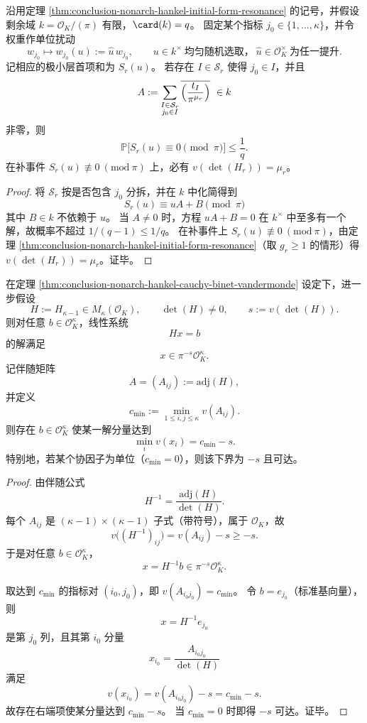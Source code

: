\begin{proposition}[有限剩余域上的随机单位扰动与首项去消去]\label{prop:conclusion-nonarch-hankel-random-unit-perturbation}
沿用定理 \ref{thm:conclusion-nonarch-hankel-initial-form-resonance} 的记号，并假设剩余域 \(k=\mathcal O_K/(\pi)\) 有限，\(\card(k)=q\)。
固定某个指标 \(j_0\in\{1,\dots,\kappa\}\)，并令权重作单位扰动
\[
w_{j_0}\longmapsto w_{j_0}(u):=\widehat u\,w_{j_0},
\qquad
u\in k^\times\ \text{均匀随机选取，}\ \widehat u\in\mathcal O_K^\times\ \text{为任一提升}.
\]
记相应的极小层首项和为 \(S_r(u)\)。
若存在 \(I\in\mathcal S_r\) 使得 \(j_0\in I\)，并且
\[
A:=\sum_{\substack{I\in\mathcal S_r\\ j_0\in I}}
\overline{\Bigl(\frac{t_I}{\pi^{\mu_r}}\Bigr)}\ \in k
\]
非零，则
\[
\mathbb P\bigl[S_r(u)\equiv 0\pmod{\pi}\bigr]\le \frac{1}{q}.
\]
在补事件 \(S_r(u)\not\equiv 0\ (\mathrm{mod}\ \pi)\) 上，必有 \(v(\det(H_r))=\mu_r\)。
\end{proposition}
\begin{proof}
将 \(\mathcal S_r\) 按是否包含 \(j_0\) 分拆，并在 \(k\) 中化简得到
\[
S_r(u)\equiv uA+B\pmod{\pi}
\]
其中 \(B\in k\) 不依赖于 \(u\)。
当 \(A\neq 0\) 时，方程 \(uA+B=0\) 在 \(k^\times\) 中至多有一个解，故概率不超过 \(1/(q-1)\le 1/q\)。
在补事件上 \(S_r(u)\not\equiv 0\ (\mathrm{mod}\ \pi)\)，由定理 \ref{thm:conclusion-nonarch-hankel-initial-form-resonance}（取 \(g_r\ge 1\) 的情形）得 \(v(\det(H_r))=\mu_r\)。证毕。
\end{proof}

\begin{corollary}\label{cor:conclusion-nonarch-prony-precision-loss}
在定理 \ref{thm:conclusion-nonarch-hankel-cauchy-binet-vandermonde} 设定下，进一步假设
\[
H:=H_{\kappa-1}\in M_\kappa(\mathcal O_K),\qquad
\det(H)\neq 0,\qquad
s:=v(\det(H)).
\]
则对任意 \(b\in\mathcal O_K^\kappa\)，线性系统
\[
Hx=b
\]
的解满足
\[
x\in \pi^{-s}\mathcal O_K^\kappa.
\]
记伴随矩阵
\[
A=(A_{ij}):=\mathrm{adj}(H),
\]
并定义
\[
c_{\min}:=\min_{1\le i,j\le \kappa}v(A_{ij}).
\]
则存在 \(b\in\mathcal O_K^\kappa\) 使某一解分量达到
\[
\min_i v(x_i)=c_{\min}-s.
\]
特别地，若某个协因子为单位（\(c_{\min}=0\)），则该下界为 \(-s\) 且可达。
\end{corollary}
\begin{proof}
由伴随公式
\[
H^{-1}=\frac{\mathrm{adj}(H)}{\det(H)}.
\]
每个 \(A_{ij}\) 是 \((\kappa-1)\times(\kappa-1)\) 子式（带符号），属于 \(\mathcal O_K\)，故
\[
v\!\bigl((H^{-1})_{ij}\bigr)=v(A_{ij})-s\ge -s.
\]
于是对任意 \(b\in\mathcal O_K^\kappa\)，
\[
x=H^{-1}b\in \pi^{-s}\mathcal O_K^\kappa.
\]

取达到 \(c_{\min}\) 的指标对 \((i_0,j_0)\)，即 \(v(A_{i_0j_0})=c_{\min}\)。
令 \(b=e_{j_0}\)（标准基向量），则
\[
x=H^{-1}e_{j_0}
\]
是第 \(j_0\) 列，且其第 \(i_0\) 分量
\[
x_{i_0}=\frac{A_{i_0j_0}}{\det(H)}
\]
满足
\[
v(x_{i_0})=v(A_{i_0j_0})-s=c_{\min}-s.
\]
故存在右端项使某分量达到 \(c_{\min}-s\)。
当 \(c_{\min}=0\) 时即得 \(-s\) 可达。证毕。
\end{proof}


